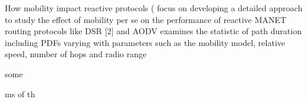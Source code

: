 \documentclass[letterpaper, 10 pt, conference]{ieeeconf}  %
\begin{document}

How mobility impact reactive protocols \cite{SadagopanPATHS:Protocolsb} ( focus on developing a detailed approach to study the effect of mobility per
se on the performance of reactive MANET routing protocols like DSR [2] and AODV \cite{DasAdRoutingb} examines the statistic of path duration including PDFs varying with parameters such as the mobility model, relative speed, number of hops and radio range 



some

ms of th
\end{document}
